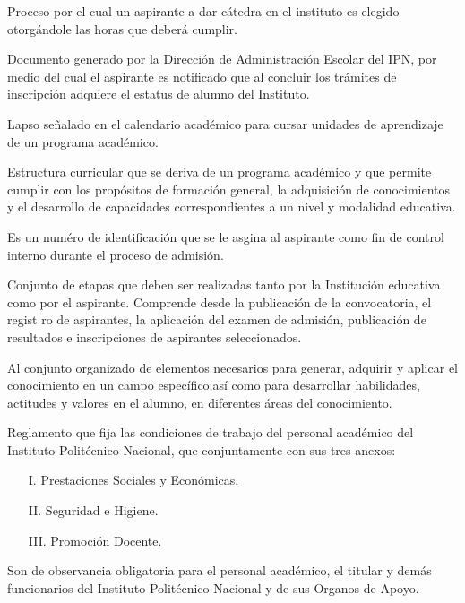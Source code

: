 \begin{bGlosario}
	 Proceso por el cual un aspirante a dar cátedra en el instituto es elegido otorgándole las horas que deberá cumplir. %
	
	
	 Documento generado por la Dirección de Administración Escolar del IPN, por medio del cual el aspirante es notificado que al concluir los trámites de inscripción adquiere el estatus de alumno del Instituto. %
	
	 Lapso señalado en el calendario académico para cursar unidades de aprendizaje de un programa académico.
	
	 Estructura curricular que se deriva de un programa académico y que permite cumplir con los propósitos de formación general,
	la adquisición de conocimientos y el desarrollo de capacidades correspondientes a un nivel y modalidad educativa.%
	
	
	 Es un numéro de identificación que se le asgina al aspirante como fin de control interno durante el proceso de admisión. %
	
	 Conjunto de etapas que deben ser realizadas tanto por la Institución educativa como por el aspirante. Comprende desde la publicación de la convocatoria, el regist ro de aspirantes, la aplicación del examen de admisión, publicación de resultados e inscripciones de aspirantes seleccionados. %
	
	 Al conjunto organizado de elementos necesarios para generar, adquirir y aplicar el conocimiento en un campo específico;así como para desarrollar
	habilidades, actitudes y valores en el alumno, en
	diferentes áreas del conocimiento. %
	
	 Reglamento que fija las condiciones de trabajo del personal académico del
	Instituto Politécnico Nacional, que conjuntamente con sus tres anexos:
	\begin{itemize}
		\item[I.] Prestaciones Sociales y Económicas.
		\item[II.] Seguridad e Higiene.
		\item[III.] Promoción Docente.
	\end{itemize}
	Son de observancia obligatoria para el personal académico, el titular y demás funcionarios del Instituto
	Politécnico Nacional y de sus Organos de Apoyo.
	

\end{bGlosario}
